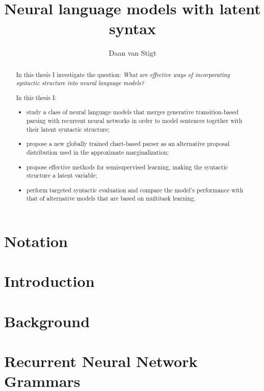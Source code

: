 \documentclass{uvamath}
\title{Neural language models with latent syntax}
\author{Daan van Stigt}
\theoremstyle{remark}
\theoremstyle{definition}
\theoremstyle{definition}
\theoremstyle{definition}
\theoremstyle{definition}
\theoremstyle{definition}
\begin{document}
\maketitle

\begin{abstract}
  In this thesis I investigate the question: \textit{What are effective ways of incorporating syntactic structure into neural language models?}

  In this thesis I:
  \begin{itemize}
    \item study a class of neural language models that merges generative transition-based parsing with recurrent neural networks in order to model sentences together with their latent syntactic structure;
    \item propose a new globally trained chart-based parser as an alternative proposal distribution used in the approximate marginalization;
    \item propose effective methods for semisupervised learning, making the syntactic structure a latent variable;
    \item perform targeted syntactic evaluation and compare the model's performance with that of alternative models that are based on multitask learning.
  \end{itemize}
\end{abstract}



{\hypersetup{linkcolor=black}
\tableofcontents
}

\chapter*{Notation}



\chapter{Introduction}
\label{01-introduction}



\chapter{Background}
\label{02-background}



\chapter{Recurrent Neural Network Grammars}
\label{03-rnng}

\end{document}
